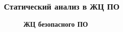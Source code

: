 \documentclass[hyperref={pdfpagelabels=false},10pt]{beamer}
\begin{document}

\begin{frame}
\frametitle{Статический анализ в ЖЦ ПО}
\begin{figure}[h]
  \vfill
  \begin{minipage}[h]{\linewidth}
    \textbf{ЖЦ безопасного ПО}
  \end{minipage}
\end{figure}
\end{frame}

\end{document}
